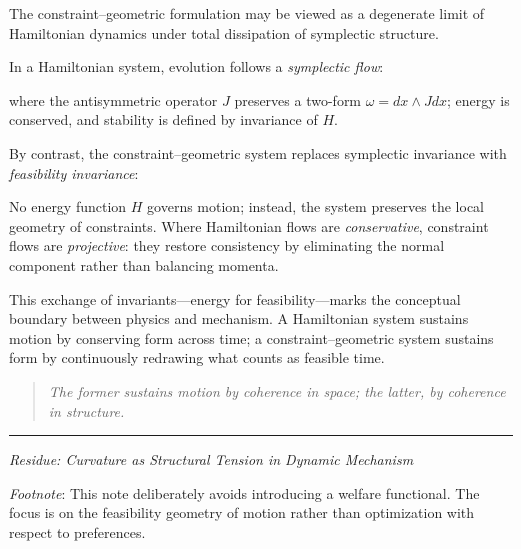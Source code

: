 \documentclass[11pt]{article}
\begin{document}
The constraint--geometric formulation may be viewed as a degenerate
limit of Hamiltonian dynamics under total dissipation of symplectic
structure.

In a Hamiltonian system, evolution follows a \emph{symplectic flow}:

\begin{Shaded}
\begin{Highlighting}[]
\end{Highlighting}
\end{Shaded}

where the antisymmetric operator \(J\) preserves a two-form
\(\omega = dx \wedge J dx\); energy is conserved, and stability is
defined by invariance of \(H\).

By contrast, the constraint--geometric system replaces symplectic
invariance with \emph{feasibility invariance}:

\begin{Shaded}
\begin{Highlighting}[]
\end{Highlighting}
\end{Shaded}

No energy function \(H\) governs motion; instead, the system preserves
the local geometry of constraints. Where Hamiltonian flows are
\emph{conservative}, constraint flows are \emph{projective}: they
restore consistency by eliminating the normal component rather than
balancing momenta.

This exchange of invariants---energy for feasibility---marks the
conceptual boundary between physics and mechanism. A Hamiltonian system
sustains motion by conserving form across time; a constraint--geometric
system sustains form by continuously redrawing what counts as feasible
time.

\begin{quote}
\emph{The former sustains motion by coherence in space; the latter, by
coherence in structure.}
\end{quote}

\begin{center}\rule{0.5\linewidth}{0.5pt}\end{center}

\emph{Residue: Curvature as Structural Tension in Dynamic Mechanism}

\emph{Footnote}: This note deliberately avoids introducing a welfare
functional. The focus is on the feasibility geometry of motion rather
than optimization with respect to preferences.



\end{document}
